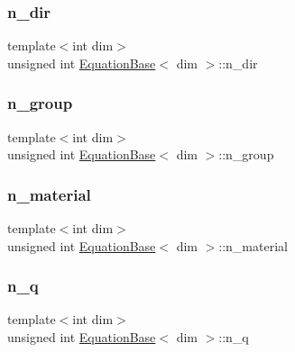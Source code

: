 \subsubsection{\texorpdfstring{n\+\_\+dir}{n\_dir}}
{\footnotesize\ttfamily template$<$int dim$>$ \\
unsigned int \hyperlink{class_equation_base}{Equation\+Base}$<$ dim $>$\+::n\+\_\+dir\hspace{0.3cm}{\ttfamily [protected]}}

\mbox{\label{class_equation_base_adf5fc09a70820108fd273b0e2183db55}} 
\subsubsection{\texorpdfstring{n\+\_\+group}{n\_group}}
{\footnotesize\ttfamily template$<$int dim$>$ \\
unsigned int \hyperlink{class_equation_base}{Equation\+Base}$<$ dim $>$\+::n\+\_\+group\hspace{0.3cm}{\ttfamily [protected]}}

\mbox{\label{class_equation_base_a6eba5e7408331bce23945068cba4ed19}} 
\subsubsection{\texorpdfstring{n\+\_\+material}{n\_material}}
{\footnotesize\ttfamily template$<$int dim$>$ \\
unsigned int \hyperlink{class_equation_base}{Equation\+Base}$<$ dim $>$\+::n\+\_\+material\hspace{0.3cm}{\ttfamily [protected]}}

\mbox{\label{class_equation_base_a8b8a299e37005a06a089ace9f473f94e}} 
\subsubsection{\texorpdfstring{n\+\_\+q}{n\_q}}
{\footnotesize\ttfamily template$<$int dim$>$ \\
unsigned int \hyperlink{class_equation_base}{Equation\+Base}$<$ dim $>$\+::n\+\_\+q\hspace{0.3cm}{\ttfamily [protected]}}

